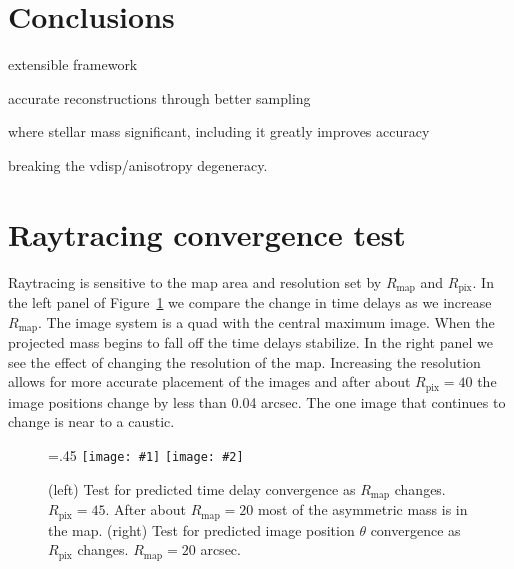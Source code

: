 \documentclass[galley,usenatbib]{mn2e}
\newcommand{\Rmap}{\ensuremath{R_\mathrm{map}}}
\newcommand{\Rpix}{\ensuremath{R_\mathrm{pix}}}
\newcommand{\figref}[1] {Figure~\ref{#1}}
\newcommand\plottwo[2]{{%
 \centering
 \leavevmode
 \columnwidth=.45\columnwidth
 \texttt{[image: \#1]}%
 \hfil
 \texttt{[image: \#2]}%
}}%
\begin{document}


\section{Conclusions}\label{sec:conclusions}

extensible framework                                                       

accurate reconstructions through better sampling                           

where stellar mass significant, including it greatly improves accuracy 

breaking the vdisp/anisotropy degeneracy.

\appendix

\section{Raytracing convergence test}
Raytracing is sensitive to the map area and resolution set by $\Rmap$ and
$\Rpix$.  In the left panel of \figref{raytracing convergence tests} we compare
the change in time delays as we increase $\Rmap$.  The image system is a quad
with the central maximum image. When the projected mass begins to fall off the
time delays stabilize. In the right panel we see the effect of changing the
resolution of the map.  Increasing the resolution allows for more accurate
placement of the images and after about $\Rpix=40$ the image positions change
by less than 0.04 arcsec. The one image that continues to change is near to a
caustic.  

\begin{figure}
\plottwo{tdconv_pr45.pdf}{imgpos_conv_mr20.pdf}
\caption{(left) Test for predicted time delay convergence as $\Rmap$ changes.
$\Rpix=45$. After about $\Rmap=20$ most of the asymmetric mass is in the map.
(right) Test for predicted image position $\theta$ convergence as $\Rpix$
changes. $\Rmap=20$ arcsec.}
\label{raytracing convergence tests}
\end{figure}
\end{document}
